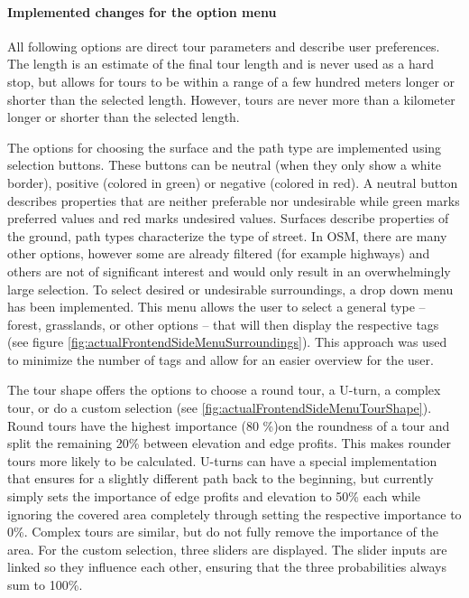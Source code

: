 \paragraph{Implemented changes for the option menu}

All following options are direct tour parameters and describe user preferences.
The length is an estimate of the final tour length and is never used as a hard stop, but allows for tours to be within a range of a few hundred meters longer or shorter than the selected length.
However, tours are never more than a kilometer longer or shorter than the selected length.


The options for choosing the surface and the path type are implemented using selection buttons.
These buttons can be neutral (when they only show a white border), positive (colored in green) or negative (colored in red). 
A neutral button describes properties that are neither preferable nor undesirable while green marks preferred values and red marks undesired values.
Surfaces describe properties of the ground, path types characterize the type of street.
In OSM, there are many other options, however some are already filtered (for example highways) and others are not of significant interest and would only result in an overwhelmingly large selection.
To select desired or undesirable surroundings, a drop down menu has been implemented.
This menu allows the user to select a general type -- forest, grasslands, or other options -- that will then display the respective tags (see figure \ref{fig:actualFrontendSideMenuSurroundings}). 
This approach was used to minimize the number of tags and allow for an easier overview for the user.

The tour shape offers the options to choose a round tour, a U-turn, a complex tour, or do a custom selection (see \ref{fig:actualFrontendSideMenuTourShape}). 
Round tours have the highest importance (80 \%)on the roundness of a tour and split the remaining 20\% between elevation and edge profits. 
This makes rounder tours more likely to be calculated.
U-turns can have a special implementation that ensures for a slightly different path back to the beginning, but currently simply sets the importance of edge profits and elevation to 50\% each while ignoring the covered area completely through setting the respective importance to 0\%.
Complex tours are similar, but do not fully remove the importance of the area. 
For the custom selection, three sliders are displayed.
The slider inputs are linked so they influence each other, ensuring that the three probabilities always sum to 100\%.

